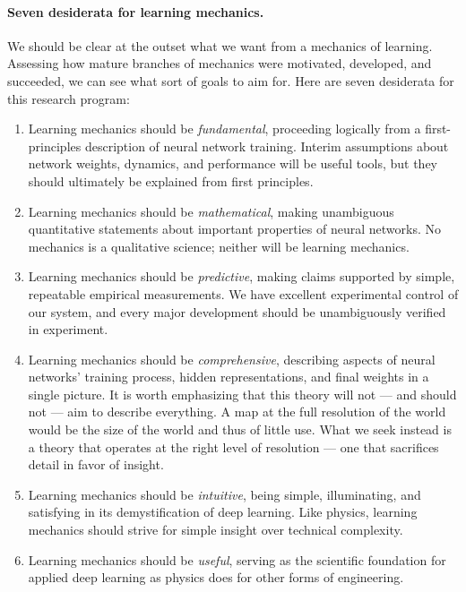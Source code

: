\paragraph{Seven desiderata for learning mechanics.}


We should be clear at the outset what we want from a mechanics of learning.
Assessing how mature branches of mechanics were motivated, developed, and succeeded, we can see what sort of goals to aim for.
Here are seven desiderata for this research program:

\begin{enumerate}[itemsep=1ex]
    \item
    Learning mechanics should be \textit{fundamental}, proceeding logically from a first-principles description of neural network training.
    Interim assumptions about network weights, dynamics, and performance will be useful tools, but they should ultimately be explained from first principles.
    \item
    Learning mechanics should be \textit{mathematical}, making unambiguous quantitative statements about important properties of neural networks.
    No mechanics is a qualitative science; neither will be learning mechanics.
    \item
    Learning mechanics should be \textit{predictive}, making claims supported by simple, repeatable empirical measurements.
    We have excellent experimental control of our system, and every major development should be unambiguously verified in experiment.
    \item Learning mechanics should be \textit{comprehensive}, describing aspects of neural networks' training process, hidden representations, and final weights in a single picture.
    It is worth emphasizing that this theory will not --- and should not --- aim to describe everything.
    A map at the full resolution of the world would be the size of the world and thus of little use.
    What we seek instead is a theory that operates at the right level of resolution --- one that sacrifices detail in favor of insight.
    \item Learning mechanics should be \textit{intuitive}, being simple, illuminating, and satisfying in its demystification of deep learning.
    Like physics, learning mechanics should strive for simple insight over technical complexity.
    \item Learning mechanics should be \emph{useful}, serving as the scientific foundation for applied deep learning as physics does for other forms of engineering.

\end{enumerate}
